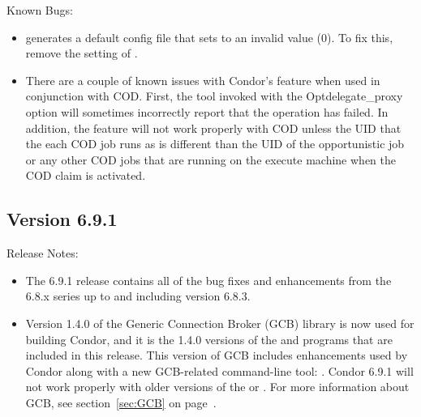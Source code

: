 \noindent Known Bugs:

\begin{itemize}

\item {} generates a default config file that sets
 to an invalid value (0).  To fix this,
remove the setting of .

\item There are a couple of known issues with Condor's
 feature when used in conjunction with
COD. First, the  tool invoked with the
Opt{delegate\_proxy} option will sometimes incorrectly report that the
operation has failed. In addition, the 
feature will not work properly with COD unless the UID that the each
COD job runs as is different than the UID of the opportunistic job or
any other COD jobs that are running on the execute machine when the
COD claim is activated.

\end{itemize}



\subsection*{\label{sec:New-6-9-1}Version 6.9.1}

\noindent Release Notes:

\begin{itemize}

\item The 6.9.1 release contains all of the bug fixes and enhancements
  from the 6.8.x series up to and including version 6.8.3.

\item Version 1.4.0 of the Generic Connection Broker (GCB) library is
  now used for building Condor, and it is the 1.4.0 versions of the
   and  programs that are
  included in this release.
  This version of GCB includes enhancements used by Condor
  along with a new GCB-related command-line tool:
  .
  Condor 6.9.1 will not work properly with older versions of the
   or .
  For more information about GCB, see section~\ref{sec:GCB} on
  page~\pageref{sec:GCB}. 

\end{itemize}

